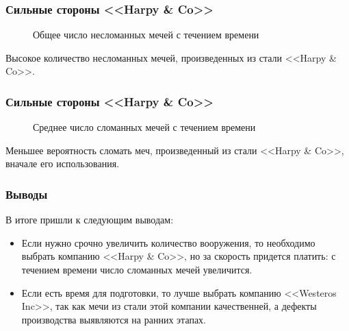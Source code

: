 \documentclass[10pt,pdf,hyperref={unicode}]{beamer}
\begin{document}
\begin{frame}
\frametitle{Сильные стороны <<Harpy \& Co>>} 
\begin{minipage}{0.4\textwidth}
 	\begin{figure}[L]
		\caption{Общее число несломанных мечей с течением времени}
	\end{figure}
\end{minipage}
\hfill
\begin{minipage}{0.4\textwidth}
	Высокое количество несломанных мечей, произведенных из стали <<Harpy \& Co>>.
\end{minipage}
\end{frame}

\begin{frame}
\frametitle{Сильные стороны <<Harpy \& Co>>} 
\begin{minipage}{0.4\textwidth}
 	\begin{figure}[L]
		\caption{Среднее число сломанных мечей с течением времени}
	\end{figure}
\end{minipage}
\hfill
\begin{minipage}{0.4\textwidth}
	Меньшее вероятность сломать меч, произведенный из стали  <<Harpy \& Co>>, вначале его использования.
\end{minipage}
\end{frame}

\begin{frame}
\frametitle{Выводы} 

В итоге пришли к следующим выводам:
\begin{itemize}
\item Если нужно срочно увеличить количество вооружения, то необходимо выбрать компанию <<Harpy \& Co>>, но за скорость придется платить: с течением времени число сломанных мечей увеличится.
\item Если есть время для подготовки, то лучше выбрать компанию <<Westeros Inc>>, так как мечи из стали этой компании качественней, а дефекты производства выявляются на ранних этапах.
\end{itemize}
\end{frame}
\end{document}
